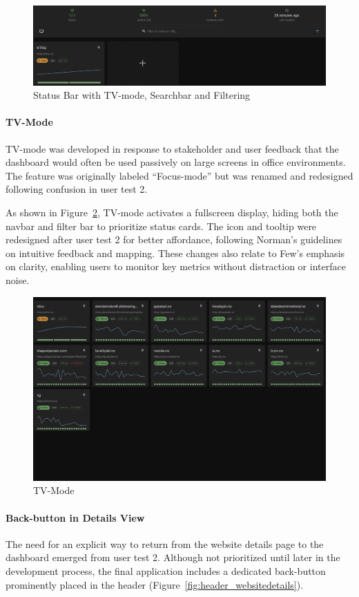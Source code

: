 \begin{figure}[H]
    \centering
    \includegraphics[width=1\linewidth]{figures/statusbar.png}
    \caption{Status Bar with TV-mode, Searchbar and Filtering}
    \label{fig:statusbar}
\end{figure}

\paragraph{TV-Mode}
TV-mode was developed in response to stakeholder and user feedback that the dashboard would often be used passively on large screens in office environments. The feature was originally labeled “Focus-mode” but was renamed and redesigned following confusion in user test 2.

As shown in Figure~\ref{fig:tv-mode}, TV-mode activates a fullscreen display, hiding both the navbar and filter bar to prioritize status cards. The icon and tooltip were redesigned after user test 2 for better affordance, following Norman’s guidelines on intuitive feedback and mapping. These changes also relate to Few’s emphasis on clarity, enabling users to monitor key metrics without distraction or interface noise.

\begin{figure}[H]
    \centering
    \includegraphics[width=0.75\linewidth]{figures/tv-mode.png}
    \caption{TV-Mode}
    \label{fig:tv-mode}
\end{figure}


\paragraph{Back-button in Details View}
The need for an explicit way to return from the website details page to the dashboard emerged from user test 2. Although not prioritized until later in the development process, the final application includes a dedicated back-button prominently placed in the header (Figure~\ref{fig:header_websitedetails}).

